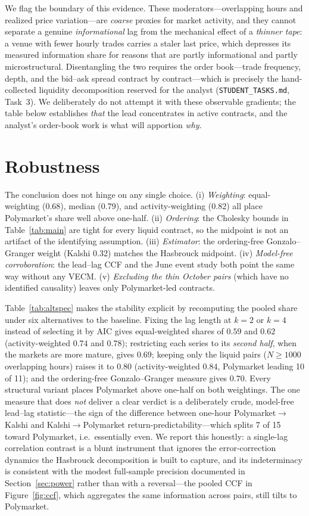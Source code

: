 \documentclass[12pt]{article}
\begin{document}
We flag the boundary of this evidence. These moderators---overlapping hours and realized price
variation---are \emph{coarse} proxies for market activity, and they cannot separate a genuine
\emph{informational} lag from the mechanical effect of a \emph{thinner tape}: a venue with fewer
hourly trades carries a staler last price, which depresses its measured information share for
reasons that are partly informational and partly microstructural. Disentangling the two requires
the order book---trade frequency, depth, and the bid--ask spread contract by contract---which is
precisely the hand-collected liquidity decomposition reserved for the analyst
(\texttt{STUDENT\_TASKS.md}, Task~3). We deliberately do not attempt it with these observable
gradients; the table below establishes \emph{that} the lead concentrates in active contracts, and
the analyst's order-book work is what will apportion \emph{why}.

\section{Robustness}\label{sec:rob}
The conclusion does not hinge on any single choice. (i) \emph{Weighting}: equal-weighting
(0.68), median (0.79), and activity-weighting (0.82) all place Polymarket's share well above
one-half. (ii) \emph{Ordering}: the Cholesky bounds in Table~\ref{tab:main} are tight for
every liquid contract, so the midpoint is not an artifact of the identifying assumption.
(iii) \emph{Estimator}: the ordering-free Gonzalo--Granger weight (Kalshi 0.32) matches the
Hasbrouck midpoint. (iv) \emph{Model-free corroboration}: the lead--lag CCF and the June
event study both point the same way without any VECM. (v) \emph{Excluding the thin October
pairs} (which have no identified causality) leaves only Polymarket-led contracts.

Table~\ref{tab:altspec} makes the stability explicit by recomputing the pooled share under six
alternatives to the baseline. Fixing the lag length at $k=2$ or $k=4$ instead of selecting it by
AIC gives equal-weighted shares of $0.59$ and $0.62$ (activity-weighted $0.74$ and $0.78$);
restricting each series to its \emph{second half}, when the markets are more mature, gives $0.69$;
keeping only the liquid pairs ($N\ge1000$ overlapping hours) raises it to $0.80$ (activity-weighted
$0.84$, Polymarket leading 10 of 11); and the ordering-free Gonzalo--Granger measure gives $0.70$.
Every structural variant places Polymarket above one-half on both weightings. The one measure that
does \emph{not} deliver a clear verdict is a deliberately crude, model-free lead--lag statistic---the
sign of the difference between one-hour Polymarket$\to$Kalshi and Kalshi$\to$Polymarket
return-predictability---which splits 7 of 15 toward Polymarket, i.e.\ essentially even. We report
this honestly: a single-lag correlation contrast is a blunt instrument that ignores the
error-correction dynamics the Hasbrouck decomposition is built to capture, and its indeterminacy is
consistent with the modest full-sample precision documented in Section~\ref{sec:power} rather than
with a reversal---the pooled CCF in Figure~\ref{fig:ccf}, which aggregates the same information
across pairs, still tilts to Polymarket.
\end{document}
